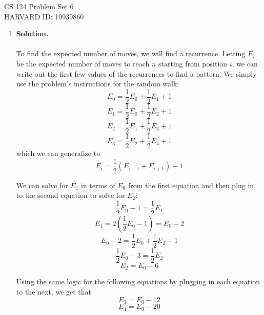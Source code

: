 \documentclass[11pt]{article}
\newcommand\solution{%
  \textbf{Solution.}\\%
}
\begin{document}
CS 124 Problem Set 6 \\
\indent HARVARD ID: 10939860

\begin{enumerate}

\item

\solution \\
To find the expected number of moves, we will find a recurrence. Letting $E_i$ be the expected number of moves to reach $n$ starting from position $i$, we can write out the first few values of the recurrences to find a pattern. We simply use the problem's instructions for the random walk:
\begin{equation*}
  E_0 = \frac{1}{2}E_0 + \frac{1}{2}E_1 + 1
\end{equation*}
\begin{equation*}
  E_1 = \frac{1}{2}E_0 + \frac{1}{2}E_2 + 1
\end{equation*}
\begin{equation*}
  E_2 = \frac{1}{2}E_1 + \frac{1}{2}E_3 + 1
\end{equation*}
\begin{equation*}
  E_3 = \frac{1}{2}E_2 + \frac{1}{2}E_4 + 1
\end{equation*}
which we can generalize to 
\begin{equation*}
  E_i = \frac{1}{2}(E_{i-1} + E_{i+1}) + 1
\end{equation*}

We can solve for $E_1$ in terms of $E_0$ from the first equation and then plug in to the second equation to solve for $E_2$:
\begin{equation*}
  \frac{1}{2}E_0 - 1 = \frac{1}{2}E_1
\end{equation*}
\begin{equation*}
  E_1 = 2(\frac{1}{2}E_0 - 1) = E_0 - 2
\end{equation*}
\begin{equation*}
  E_0 - 2 = \frac{1}{2}E_0 + \frac{1}{2}E_2 + 1
\end{equation*}
\begin{equation*}
  \frac{1}{2}E_0 - 3 = \frac{1}{2}E_2
\end{equation*}
\begin{equation*}
  E_2 = E_0 - 6
\end{equation*}

Using the same logic for the following equations by plugging in each equation to the next, we get that 
\begin{equation*}
  E_3 = E_0 - 12
\end{equation*}
\begin{equation*}
  E_4 = E_0 - 20
\end{equation*}


\end{enumerate}
\end{document}
